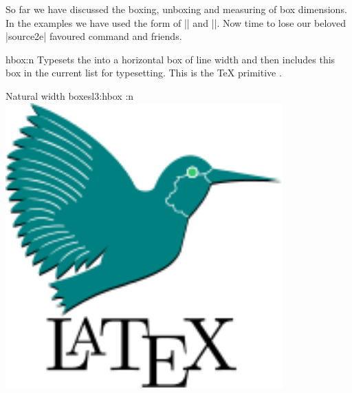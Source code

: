 So far we have discussed the boxing, unboxing and measuring of box dimensions. In the examples we have used
the  form of |\hbox| and |\vbox|.  Now time to lose our  beloved |source2e| favoured command  and friends. 

 \begin{docCommand}{hbox:n}{ }
   Typesets the  into a horizontal box of line width and then includes this box in the current list for typesetting.
   This is the \TeX{} primitive .
 \end{docCommand}


\begin{texexample}{Natural width boxes}{l3:hbox}
\ExplSyntaxOn
\hbox:n{\includegraphics[width=0.8\textwidth]{latex3}}
\ExplSyntaxOff
\end{texexample}

